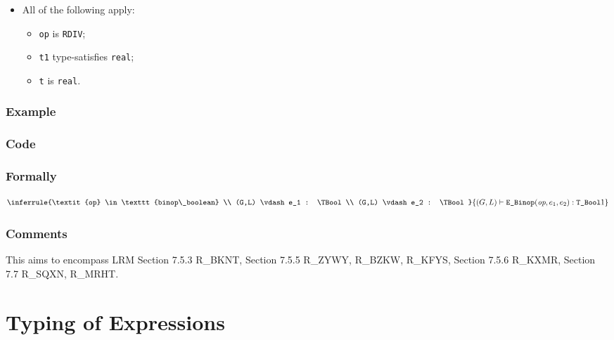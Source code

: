 \documentclass{book}
\begin{document}
\begin{itemize}
  \item All of the following apply:
    \begin{itemize}
    \item \texttt{op} is \texttt{RDIV};
    \item \texttt{t1} type-satisfies \texttt{real};
    \item \texttt{t} is \texttt{real}.
    \end{itemize}
\end{itemize}

  \subsection{Example} 

  \subsection{Code}

\begin{formal}
    \subsection{Formally}
  \[
  \inferrule
  {\textit{op} \in \texttt{binop\_boolean} \\ (G,L) \vdash e_1 : \TBool \\ (G,L) \vdash e_2 : \TBool}
  {(G,L) \vdash \texttt{E\_Binop}(\textit{op}, e_1, e_2) : \TBool1}
  \]
\end{formal}

\subsection{Comments}
  This aims to encompass LRM Section 7.5.3 R\_BKNT, Section 7.5.5 R\_ZYWY, R\_BZKW,
  R\_KFYS, Section 7.5.6 R\_KXMR, Section 7.7 R\_SQXN, R\_MRHT.

\chapter{Typing of Expressions}
\end{document}
